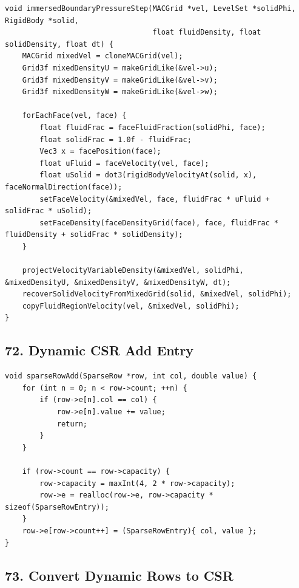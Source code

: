 \documentclass[10pt,letterpaper]{article}
\begin{document}
\begin{verbatim}
void immersedBoundaryPressureStep(MACGrid *vel, LevelSet *solidPhi, RigidBody *solid,
                                  float fluidDensity, float solidDensity, float dt) {
    MACGrid mixedVel = cloneMACGrid(vel);
    Grid3f mixedDensityU = makeGridLike(&vel->u);
    Grid3f mixedDensityV = makeGridLike(&vel->v);
    Grid3f mixedDensityW = makeGridLike(&vel->w);

    forEachFace(vel, face) {
        float fluidFrac = faceFluidFraction(solidPhi, face);
        float solidFrac = 1.0f - fluidFrac;
        Vec3 x = facePosition(face);
        float uFluid = faceVelocity(vel, face);
        float uSolid = dot3(rigidBodyVelocityAt(solid, x), faceNormalDirection(face));
        setFaceVelocity(&mixedVel, face, fluidFrac * uFluid + solidFrac * uSolid);
        setFaceDensity(faceDensityGrid(face), face, fluidFrac * fluidDensity + solidFrac * solidDensity);
    }

    projectVelocityVariableDensity(&mixedVel, solidPhi, &mixedDensityU, &mixedDensityV, &mixedDensityW, dt);
    recoverSolidVelocityFromMixedGrid(solid, &mixedVel, solidPhi);
    copyFluidRegionVelocity(vel, &mixedVel, solidPhi);
}
\end{verbatim}

\subsection*{72. Dynamic CSR Add Entry}

\begin{verbatim}
void sparseRowAdd(SparseRow *row, int col, double value) {
    for (int n = 0; n < row->count; ++n) {
        if (row->e[n].col == col) {
            row->e[n].value += value;
            return;
        }
    }

    if (row->count == row->capacity) {
        row->capacity = maxInt(4, 2 * row->capacity);
        row->e = realloc(row->e, row->capacity * sizeof(SparseRowEntry));
    }
    row->e[row->count++] = (SparseRowEntry){ col, value };
}
\end{verbatim}

\subsection*{73. Convert Dynamic Rows to CSR}
\end{document}
